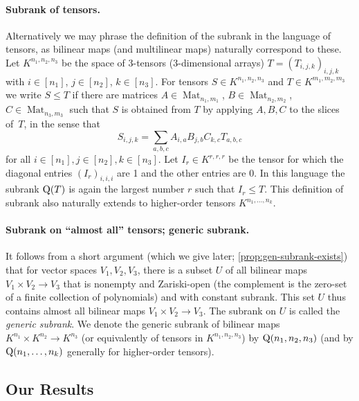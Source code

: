 \documentclass[10pt,a4paper]{article}
\theoremstyle{definition}
\theoremstyle{remark}
\newcommand{\subrank}{{\rm Q}}
\newcommand{\gensubrank}{{\rm Q}}
\newcommand{\Mat}{\operatorname{Mat}}
\begin{document}
\paragraph{Subrank of tensors.} Alternatively we may phrase the definition of the subrank in the language of tensors, as bilinear maps (and multilinear maps) naturally correspond to these. Let $K^{n_1, n_2, n_3}$ be the space of 3-tensors (3-dimensional arrays) $T = (T_{i,j,k})_{i,j,k}$ with $i \in [n_1]$, $j \in [n_2]$, $k \in [n_3]$. For tensors $S \in K^{n_1, n_2, n_3}$ and $T \in K^{m_1, m_2, m_3}$ we write $S \leq T$ if there are matrices $A \in \Mat_{n_1, m_1}$, $B \in \Mat_{n_2, m_2}$, $C \in \Mat_{n_3, m_3}$ such that $S$ is obtained from $T$ by applying $A,B,C$ to the slices of~$T$, in the sense that
\[
S_{i,j,k} = \sum_{a,b,c} A_{i,a} B_{j,b} C_{k,c} T_{a,b,c}
\]
for all $i \in [n_1], j \in [n_2], k \in [n_3]$. Let $I_r \in K^{r,r,r}$ be the tensor for which the diagonal entries $(I_r)_{i,i,i}$ are 1 and the other entries are 0. In this language the subrank $\subrank(T)$ is again the largest number $r$ such that $I_r \leq T$. This definition of subrank also naturally extends to higher-order tensors $K^{n_1, \ldots, n_k}$.

\paragraph{Subrank on ``almost all'' tensors; generic subrank.}
It follows from a short argument (which we give later; \autoref{prop:gen-subrank-exists}) that for vector spaces $V_1,V_2,V_3$, there is a subset $U$ of all bilinear maps $V_1 \times V_2 \to V_3$ that is nonempty and Zariski-open (the complement is the zero-set of a finite collection of polynomials) and with constant subrank. This set $U$ thus contains almost all bilinear maps $V_1 \times V_2 \to V_3$. The subrank on $U$ is called the \emph{generic subrank}. We denote the generic subrank of bilinear maps $K^{n_1} \times K^{n_2} \to K^{n_3}$ (or equivalently of tensors in $K^{n_1, n_2, n_3}$) by $\gensubrank(n_1, n_2, n_3)$ (and by $\gensubrank(n_1, \ldots, n_k)$ generally for higher-order tensors).



%



\subsection{Our Results}\label{subsec:results}

%
\end{document}

